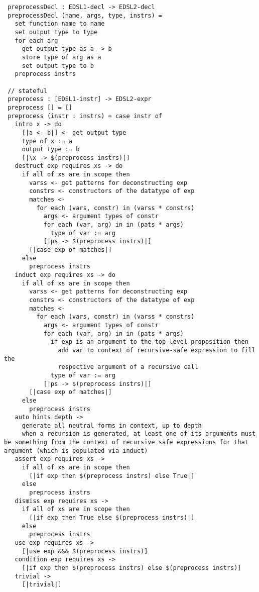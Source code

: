  \begin{verbatim}
 preprocessDecl : EDSL1-decl -> EDSL2-decl
 preprocessDecl (name, args, type, instrs) =
   set function name to name
   set output type to type
   for each arg
     get output type as a -> b 
     store type of arg as a
     set output type to b
   preprocess instrs
  
 // stateful
 preprocess : [EDSL1-instr] -> EDSL2-expr
 preprocess [] = []
 preprocess (instr : instrs) = case instr of 
   intro x -> do
     [|a <- b|] <- get output type
     type of x := a
     output type := b
     [|\x -> $(preprocess instrs)|]
   destruct exp requires xs -> do
     if all of xs are in scope then 
       varss <- get patterns for deconstructing exp
       constrs <- constructors of the datatype of exp
       matches <- 
         for each (vars, constr) in (varss * constrs)
           args <- argument types of constr
           for each (var, arg) in in (pats * args)
             type of var := arg
           [|ps -> $(preprocess instrs)|]
       [|case exp of matches|]
     else
       preprocess instrs
   induct exp requires xs -> do
     if all of xs are in scope then 
       varss <- get patterns for deconstructing exp
       constrs <- constructors of the datatype of exp
       matches <-
         for each (vars, constr) in (varss * constrs)
           args <- argument types of constr
           for each (var, arg) in in (pats * args)
             if exp is an argument to the top-level proposition then
               add var to context of recursive-safe expression to fill the
               respective argument of a recursive call
             type of var := arg
           [|ps -> $(preprocess instrs)|]
       [|case exp of matches|]
     else
       preprocess instrs
   auto hints depth ->
     generate all neutral forms in context, up to depth
     when a recursion is generated, at least one of its arguments must be something from the context of recursive safe expressions for that argument (which is populated via induct)
   assert exp requires xs ->
     if all of xs are in scope then
       [|if exp then $(preprocess instrs) else True|]
     else
       preprocess instrs
   dismiss exp requires xs ->
     if all of xs are in scope then
       [|if exp then True else $(preprocess instrs)|]
     else
       preprocess instrs
   use exp requires xs -> 
     [|use exp &&& $(preprocess instrs)]
   condition exp requires xs ->
     [|if exp then $(preprocess instrs) else $(preprocess instrs)]
   trivial ->
     [|trivial|]
 \end{verbatim}


